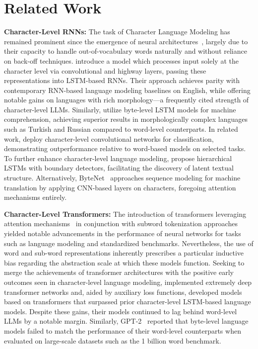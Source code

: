 \section{Related Work}
\label{section:related_work}

\textbf{Character-Level RNNs:} The task of Character Language Modeling has remained prominent since the emergence of neural architectures~\citep{sutskever2011generating,mikolov2012subword,graves2013generating}, largely due to their capacity to handle out-of-vocabulary words naturally and without reliance on back-off techniques. \cite{kim2016character} introduce a model which processes input solely at the character level via convolutional and highway layers, passing these representations into LSTM-based RNNs. Their approach achieves parity with contemporary RNN-based language modeling baselines on English, while offering notable gains on languages with rich morphology—a frequently cited strength of character-level LLMs. Similarly, \cite{kenter2018byte} utilize byte-level LSTM models for machine comprehension, achieving superior results in morphologically complex languages such as Turkish and Russian compared to word-level counterparts. In related work, \cite{zhang2015character} deploy character-level convolutional networks for classification, demonstrating outperformance relative to word-based models on selected tasks. To further enhance character-level language modeling, \citet{chung2019hierarchical} propose hierarchical LSTMs with boundary detectors, facilitating the discovery of latent textual structure. Alternatively, ByteNet~\citep{kalchbrenner2016neural} approaches sequence modeling for machine translation by applying CNN-based layers on characters, foregoing attention mechanisms entirely.

\textbf{Character-Level Transformers:} The introduction of transformers leveraging attention mechanisms~\citep{vaswani2017attention} in conjunction with subword tokenization approaches~\citep{sennrich-etal-2016-neural} yielded notable advancements in the performance of neural networks for tasks such as language modeling and standardized benchmarks. Nevertheless, the use of word and sub-word representations inherently prescribes a particular inductive bias regarding the abstraction scale at which these models function. Seeking to merge the achievements of transformer architectures with the positive early outcomes seen in character-level language modeling, \citet{al2019character} implemented extremely deep transformer networks and, aided by auxiliary loss functions, developed models based on transformers that surpassed prior character-level LSTM-based language models. Despite these gains, their models continued to lag behind word-level LLMs by a notable margin. Similarly, GPT-2~\citep{radfordgpt2} reported that byte-level language models failed to match the performance of their word-level counterparts when evaluated on large-scale datasets such as the 1 billion word benchmark.

